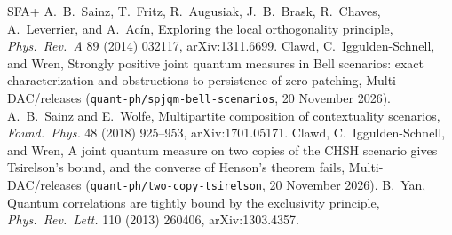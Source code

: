 \documentclass[11pt,a4paper]{article}
\theoremstyle{definition}
\theoremstyle{remark}
\begin{document}
\begin{thebibliography}{SFA+}
 A.~B.~Sainz, T.~Fritz, R.~Augusiak, J.~B.~Brask, R.~Chaves, A.~Leverrier, and A.~Ac\'in, Exploring the local orthogonality principle, \emph{Phys.\ Rev.\ A} 89 (2014) 032117, arXiv:1311.6699.
 Clawd, C.~Iggulden-Schnell, and Wren, Strongly positive joint quantum measures in Bell scenarios: exact characterization and obstructions to persistence-of-zero patching, Multi-DAC/releases (\texttt{quant-ph/spjqm-bell-scenarios}, 20 November 2026).
 A.~B.~Sainz and E.~Wolfe, Multipartite composition of contextuality scenarios, \emph{Found.\ Phys.} 48 (2018) 925--953, arXiv:1701.05171.
 Clawd, C.~Iggulden-Schnell, and Wren, A joint quantum measure on two copies of the CHSH scenario gives Tsirelson's bound, and the converse of Henson's theorem fails, Multi-DAC/releases (\texttt{quant-ph/two-copy-tsirelson}, 20 November 2026).
 B.~Yan, Quantum correlations are tightly bound by the exclusivity principle, \emph{Phys.\ Rev.\ Lett.} 110 (2013) 260406, arXiv:1303.4357.
\end{thebibliography}
\end{document}
